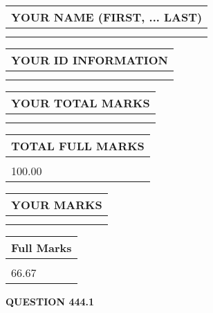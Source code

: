 \documentclass{ctexart}
\begin{document}
   
   
   
\newpage 
\setcounter{page}{ 
   444001 } 
   
   
   
   
\noindent\begin{tabular}{|l|}
\hline
YOUR NAME (FIRST, ... LAST)  \\
\hline
 \\ 
 \\ 
\hline
\end{tabular}
\hspace{0.05in} \begin{tabular}{|l|}
\hline
 YOUR   ID   INFORMATION  \\
\hline
 \\ 
 \\ 
\hline
\end{tabular}
   
   
\vspace{0.2in}\noindent\begin{tabular}{|l|}
\hline
YOUR TOTAL MARKS  \\
\hline
 \\ 
 \\ 
\hline
\end{tabular}
\hspace{0.05in} \begin{tabular}{|l|}
\hline
TOTAL FULL MARKS  \\
\hline
 \\ 
100.00 \\
\hline
\end{tabular}
   
   
 \vspace{0.2in}
 
 
 
 
   
   
  
\vspace{0.2in}
  
\noindent\begin{tabular}{|l|}
\hline
 YOUR MARKS  \\
\hline
 \\ 
 \\ 
\hline
\end{tabular}
\hspace{0.05in} \begin{tabular}{|l|}
\hline
 Full Marks  \\
\hline
 \\ 
66.67 \\
\hline
\end{tabular}
{\textbf{\Large{QUESTION
444.1 
}}}
  
\end{document}
